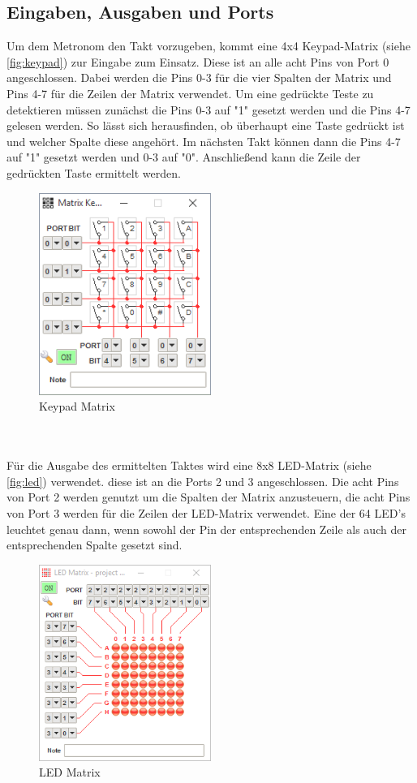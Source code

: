 \documentclass[a4paper, 12pt]{scrartcl}
\begin{document}
\begin{onehalfspace}
\subsection{Eingaben, Ausgaben und Ports}
Um dem Metronom den Takt vorzugeben, kommt eine 4x4 Keypad-Matrix (siehe \autoref{fig:keypad}) zur Eingabe zum Einsatz. Diese ist an alle acht Pins von Port 0 angeschlossen. Dabei werden die Pins 0-3 für die vier Spalten der Matrix und Pins 4-7 für die Zeilen der Matrix verwendet. Um eine gedrückte Teste zu detektieren müssen zunächst die Pins 0-3 auf "1" gesetzt werden und die Pins 4-7 gelesen werden. So lässt sich herausfinden, ob überhaupt eine Taste gedrückt ist und welcher Spalte diese angehört. Im nächsten Takt können dann die Pins 4-7 auf "1" gesetzt werden und 0-3 auf "0". Anschließend kann die Zeile der gedrückten Taste ermittelt werden.
\begin{figure}[h]
\centering
\includegraphics[width=0.5\textwidth]{keypad.png}
\caption{Keypad Matrix}
\label{fig:keypad}
\end{figure}
\\
\\
Für die Ausgabe des ermittelten Taktes wird eine 8x8 LED-Matrix (siehe \autoref{fig:led}) verwendet. diese ist an die Ports 2 und 3 angeschlossen. Die acht Pins von Port 2 werden genutzt um die Spalten der Matrix anzusteuern, die acht Pins von Port 3 werden für die Zeilen der LED-Matrix verwendet. Eine der 64 LED's leuchtet genau dann, wenn sowohl der Pin der entsprechenden Zeile als auch der entsprechenden Spalte gesetzt sind.
\begin{figure}[h]
\centering
\includegraphics[width=0.5\textwidth]{led.png}
\caption{LED Matrix}
\label{fig:led}
\end{figure}

\end{onehalfspace}
\end{document}
